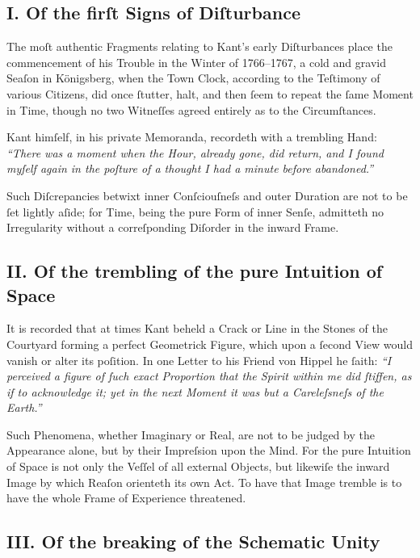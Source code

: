 \documentclass[12pt]{article}
\begin{document}
\subsection*{I. Of the firſt Signs of Diſturbance}

The moſt authentic Fragments relating to Kant’s early Diſturbances place the 
commencement of his Trouble in the Winter of 1766–1767, a cold and gravid 
Seaſon in Königsberg, when the Town Clock, according to the Teſtimony of 
various Citizens, did once ſtutter, halt, and then ſeem to repeat the ſame 
Moment in Time, though no two Witneſſes agreed entirely as to the 
Circumſtances.

Kant himſelf, in his private Memoranda, recordeth with a trembling Hand:  
\textit{“There was a moment when the Hour, already gone, did return, and I found 
myſelf again in the poſture of a thought I had a minute before abandoned.”}

Such Diſcrepancies betwixt inner Conſciouſneſs and outer Duration are not to be 
ſet lightly aſide; for Time, being the pure Form of inner Senſe, admitteth no 
Irregularity without a correſponding Diſorder in the inward Frame.

\subsection*{II. Of the trembling of the pure Intuition of Space}

It is recorded that at times Kant beheld a Crack or Line in the Stones of the 
Courtyard forming a perfect Geometrick Figure, which upon a ſecond View would 
vanish or alter its poſition. In one Letter to his Friend von Hippel he 
ſaith:  
\textit{“I perceived a figure of ſuch exact Proportion that the Spirit within me 
did ſtiffen, as if to acknowledge it; yet in the next Moment it was but a 
Careleſsneſs of the Earth.”}

Such Phenomena, whether Imaginary or Real, are not to be judged by the 
Appearance alone, but by their Impreſsion upon the Mind. For the pure 
Intuition of Space is not only the Veſſel of all external Objects, but 
likewiſe the inward Image by which Reaſon orienteth its own Act. To have that 
Image tremble is to have the whole Frame of Experience threatened.

\subsection*{III. Of the breaking of the Schematic Unity}
\end{document}
